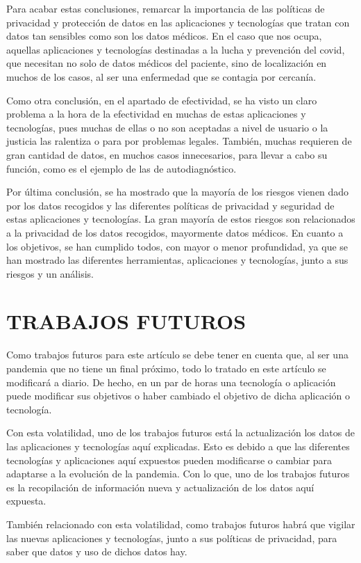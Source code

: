 \documentclass[11pt,a4paper,spanish]{article}
\begin{document}
Para acabar estas conclusiones, remarcar la importancia de las políticas de privacidad y protección de datos en las aplicaciones y tecnologías que tratan con datos tan sensibles como son los datos médicos. En el caso que nos ocupa, aquellas aplicaciones y tecnologías destinadas a la lucha y prevención del covid, que necesitan no solo de datos médicos del paciente, sino de localización en muchos de los casos, al ser una enfermedad que se contagia por cercanía.

Como otra conclusión, en el apartado de efectividad, se ha visto un claro problema a la hora de la efectividad en muchas de estas aplicaciones y tecnologías, pues muchas de ellas o no son aceptadas a nivel de usuario o la justicia las ralentiza o para por problemas legales. También, muchas requieren de gran cantidad de datos, en muchos casos innecesarios, para llevar a cabo su función, como es el ejemplo de las de autodiagnóstico.

Por última conclusión, se ha mostrado que la mayoría de los riesgos vienen dado por los datos recogidos y las diferentes políticas de privacidad y seguridad de estas aplicaciones y tecnologías. La gran mayoría de estos riesgos son relacionados a la privacidad de los datos recogidos, mayormente datos médicos.
En cuanto a los objetivos, se han cumplido todos, con mayor o menor profundidad, ya que se han mostrado las diferentes herramientas, aplicaciones y tecnologías, junto a sus riesgos y un análisis.

\section{TRABAJOS FUTUROS}

Como trabajos futuros para este artículo se debe tener en cuenta que, al ser una pandemia que no tiene un final próximo, todo lo tratado en este artículo se modificará a diario. De hecho, en un par de horas una tecnología o aplicación puede modificar sus objetivos o haber cambiado el objetivo de dicha aplicación o tecnología. 

Con esta volatilidad, uno de los trabajos futuros está la actualización los datos de las aplicaciones y tecnologías aquí explicadas. Esto es debido a que las diferentes tecnologías y aplicaciones aquí expuestos pueden modificarse o cambiar para adaptarse a la evolución de la pandemia. Con lo que, uno de los trabajos futuros es la recopilación de información nueva y actualización de los datos aquí expuesta.

También relacionado con esta volatilidad, como trabajos futuros habrá que vigilar las nuevas aplicaciones y tecnologías, junto a sus políticas de privacidad, para saber que datos y uso de dichos datos hay. 
\end{document}
